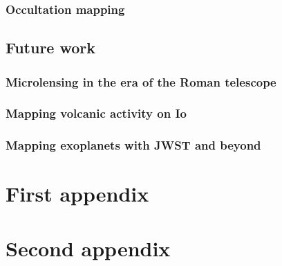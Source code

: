 \documentclass[]{report}
\begin{document}
\subsection{Occultation mapping}
\section{Future work}
\subsection{Microlensing in the era of the Roman telescope}
\subsection{Mapping volcanic activity on Io}
\subsection{Mapping exoplanets with JWST and beyond}

\appendix

\chapter{First appendix}
\chapter{Second appendix}
\end{document}
